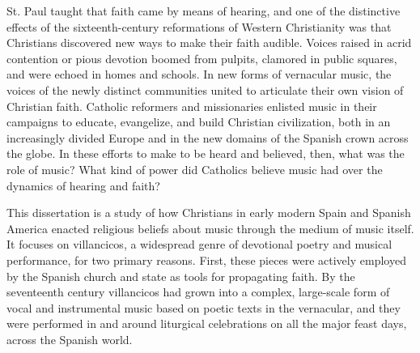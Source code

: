 




St. Paul taught that faith came by means of hearing, and one of the distinctive effects of the sixteenth-century reformations of Western Christianity was that Christians discovered new ways to make their faith audible.
Voices raised in acrid contention or pious devotion boomed from pulpits, clamored in public squares, and were echoed in homes and schools.
In new forms of vernacular music, the voices of the newly distinct communities united to articulate their own vision of Christian faith.
Catholic reformers and missionaries enlisted music in their campaigns to educate, evangelize, and build Christian civilization, both in an increasingly divided Europe and in the new domains of the Spanish crown across the globe.
In these efforts to make  to be heard and believed, then, what was the role of music?
What kind of power did Catholics believe music had over the dynamics of hearing and faith?

This dissertation is a study of how Christians in early modern Spain and Spanish America enacted religious beliefs about music through the medium of music itself.
It focuses on villancicos, a widespread genre of devotional poetry and musical performance, for two primary reasons.
First, these pieces were actively employed by the Spanish church and state as tools for propagating faith.
By the seventeenth century villancicos had grown into a complex, large-scale form of vocal and instrumental music based on poetic texts in the vernacular, and they were performed in and around liturgical celebrations on all the major feast days, across the Spanish world.

